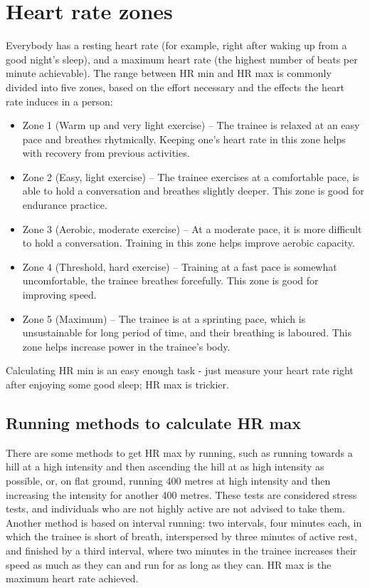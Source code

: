 \section{Heart rate zones}

Everybody has a resting heart rate (for example, right after waking up from a good night's sleep), and a maximum heart rate (the highest number of beats per minute achievable).
The range between HR min and HR max is commonly divided into five zones, based on the effort necessary and the effects the heart rate induces in a person:
\begin{itemize}
    \item Zone 1 (Warm up and very light exercise) --
    The trainee is relaxed at an easy pace and breathes rhytmically. Keeping one's heart rate in this zone helps with recovery from previous activities.
    \item Zone 2 (Easy, light exercise) --
    The trainee exercises at a comfortable pace, is able to hold a conversation and breathes slightly deeper. This zone is good for endurance practice.
    \item Zone 3 (Aerobic, moderate exercise) --
    At a moderate pace, it is more difficult to hold a conversation. Training in this zone helps improve aerobic capacity.
    \item Zone 4 (Threshold, hard exercise) --
    Training at a fast pace is somewhat uncomfortable, the trainee breathes forcefully. This zone is good for improving speed.
    \item Zone 5 (Maximum) --
    The trainee is at a sprinting pace, which is unsustainable for long period of time, and their breathing is laboured.
    This zone helps increase power in the trainee's body.\cite{garmin-heart-zones}\cite{polar-heart-zones}
\end{itemize}

Calculating HR min is an easy enough task - just measure your heart rate right after enjoying some good sleep; HR max is trickier.

\subsection*{Running methods to calculate HR max}
There are some methods to get HR max by running, such as running towards a hill at a high intensity and then ascending the hill at as high intensity as possible,
or, on flat ground, running 400 metres at high intensity and then increasing the intensity for another 400 metres.
These tests are considered stress tests, and individuals who are not highly active are not advised to take them. \cite{hrmax-running-tests}
Another method is based on interval running:
two intervals, four minutes each, in which the trainee is short of breath, interspersed by three minutes of active rest, and finished by a third interval, where two minutes in the trainee increases their speed as much as they can and run for as long as they can.
HR max is the maximum heart rate achieved.\cite{hrmax-running-tests-intervals}

